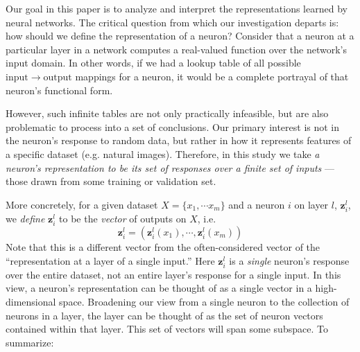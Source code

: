 \documentclass{article} %
\begin{document}
Our goal in this paper is to analyze and interpret the representations learned by neural networks. The critical question from which our investigation departs is: how should we define the representation of a neuron?
Consider that a neuron at a particular layer in a network computes a real-valued function over the network's input domain. 
In other words, if we had a lookup table of all possible $\mathrm{input} \rightarrow \mathrm{output}$ mappings for a neuron, it would be a complete portrayal of that neuron's functional form.

However, such infinite tables are not only practically infeasible, but are also problematic to process into a set of conclusions. 
Our primary interest is not in the neuron's response to random data, but rather in how it represents features of a specific dataset (e.g. natural images).
Therefore, in this study we take \emph{a neuron's representation to be its set of responses over a finite set of inputs} 
--- those drawn from some training or validation set.


More concretely,
for a given dataset $X = \{ x_1, \cdots x_m \}$ and a neuron $i$ on layer $l$, $\pmb{z}^l_i$, we \textit{define} $\pmb{z}^l_i$ to be the \textit{vector} of outputs on $X$, i.e.
\[ \pmb{z}^l_i = (\pmb{z}^l_i(x_1), \cdots , \pmb{z}^l_i(x_m)) \]
Note that this is a different vector from the often-considered vector of the ``representation at a layer of a single input.''  Here $\pmb{z}^l_i$ is a \textit{single} neuron's response over the entire dataset, not an entire layer's response for a single input.
In this view, a neuron's representation can be thought of as a single vector in a high-dimensional space.
Broadening our view from a single neuron to the collection of neurons in a layer, the layer can be thought
of as the set of neuron vectors contained within that layer. This set of vectors will span some subspace.
To summarize:
\end{document}
